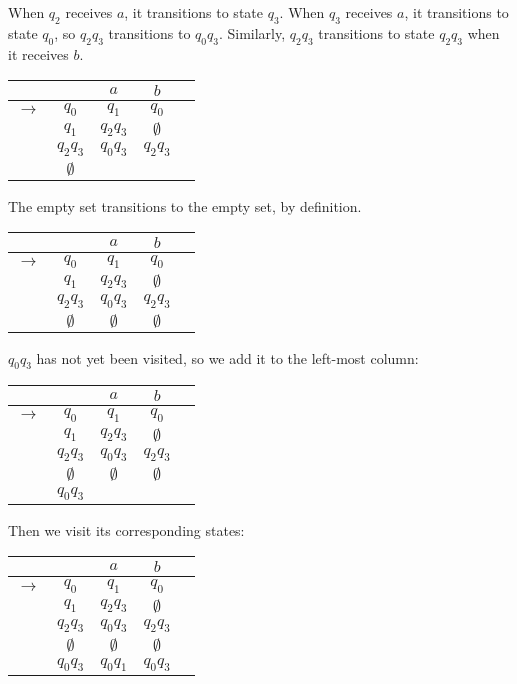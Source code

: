 When $q_2$ receives $a$, it transitions to state $q_3$. When $q_3$ receives $a$, it transitions to state $q_0$, so $q_2q_3$ transitions to $q_0q_3$. Similarly, $q_2q_3$ transitions to state $q_2q_3$ when it receives $b$.

\begin{center}\begin{tabular}{c c|c c r}
         & & $a$ & $b$ & \\\hline
    $\to$ & $q_0$ & $q_1$ & $q_0$ &  \\
          & $q_1$ & $q_2q_3$ & $\emptyset$ & \\
          & $q_2q_3$ & $q_0q_3$ & $q_2q_3$ & \\
          & $\emptyset$ & & &
\end{tabular}\end{center}

The empty set transitions to the empty set, by definition. 

\begin{center}\begin{tabular}{c c|c c r}
         & & $a$ & $b$ & \\\hline
    $\to$ & $q_0$ & $q_1$ & $q_0$ &  \\
          & $q_1$ & $q_2q_3$ & $\emptyset$ & \\
          & $q_2q_3$ & $q_0q_3$ & $q_2q_3$ & \\
          & $\emptyset$ & $\emptyset$ & $\emptyset$ &
\end{tabular}\end{center}

$q_0q_3$ has not yet been visited, so we add it to the left-most column:

\begin{center}\begin{tabular}{c c|c c r}
         & & $a$ & $b$ & \\\hline
    $\to$ & $q_0$ & $q_1$ & $q_0$ &  \\
          & $q_1$ & $q_2q_3$ & $\emptyset$ & \\
          & $q_2q_3$ & $q_0q_3$ & $q_2q_3$ & \\
          & $\emptyset$ & $\emptyset$ & $\emptyset$ &\\
          & $q_0q_3$ & & & 
\end{tabular}\end{center}

Then we visit its corresponding states:

\begin{center}\begin{tabular}{c c|c c r}
         & & $a$ & $b$ & \\\hline
    $\to$ & $q_0$ & $q_1$ & $q_0$ &  \\
          & $q_1$ & $q_2q_3$ & $\emptyset$ & \\
          & $q_2q_3$ & $q_0q_3$ & $q_2q_3$ & \\
          & $\emptyset$ & $\emptyset$ & $\emptyset$ &\\
          & $q_0q_3$ & $q_0q_1$ & $q_0q_3$ & 
\end{tabular}\end{center}

